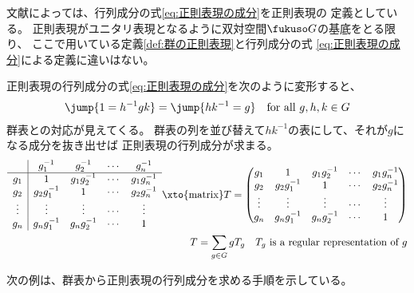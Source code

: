 	文献によっては、行列成分の式\eqref{eq:正則表現の成分}を正則表現の
	定義としている\cite{bk:kikkawa.gun}。
	正則表現がユニタリ表現となるように双対空間$\fukuso G$の基底をとる限り、
	ここで用いている定義\ref{def:群の正則表現}と行列成分の式
	\eqref{eq:正則表現の成分}による定義に違いはない。

	正則表現の行列成分の式\eqref{eq:正則表現の成分}を次のように変形すると、
	\begin{equation*}\begin{split}
		\jump{1=h^{-1}gk} = \jump{hk^{-1}=g} \quad\text{for all }g,h,k\in G
	\end{split}\end{equation*}
	群表との対応が見えてくる。
	群表の列を並び替えて$hk^{-1}$の表にして、それが$g$になる成分を抜き出せば
	正則表現の行列成分が求まる。
	\begin{equation*}\begin{split}
		\begin{array}{c|cccc}
			& g_1^{-1} & g_2^{-1} & \cdots & g_n^{-1} \\ \hline
			g_1 & 1 & g_1g_2^{-1} & \cdots & g_1g_n^{-1} \\
			g_2 & g_2g_1^{-1} & 1 & \cdots & g_2g_n^{-1} \\
			\vdots & \vdots & \vdots & \cdots & \vdots \\
			g_n & g_ng_1^{-1} & g_ng_2^{-1} & \cdots & 1 \\
		\end{array} \xto{\text{matrix}} T = \begin{pmatrix}
			g_1 & 1 & g_1g_2^{-1} & \cdots & g_1g_n^{-1} \\
			g_2 & g_2g_1^{-1} & 1 & \cdots & g_2g_n^{-1} \\
			\vdots & \vdots & \vdots & \cdots & \vdots \\
			g_n & g_ng_1^{-1} & g_ng_2^{-1} & \cdots & 1 \\
		\end{pmatrix} \\
		T = \sum_{g\in G}gT_g
		\quad\text{$T_g$ is a regular representation of $g$}
	\end{split}\end{equation*}

	次の例は、群表から正則表現の行列成分を求める手順を示している。

